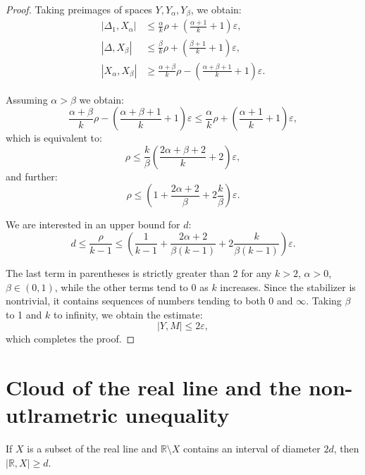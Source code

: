 \documentclass[leqno]{article}
\begin{document}
\begin{proof}
    Taking preimages of spaces $Y, Y_{\alpha}, Y_{\beta}$, we obtain:
    \begin{align*}
        |\Delta_1, X_{\alpha}| &\leq \frac{\alpha}{k}\rho +
        \left(\frac{\alpha+1}{k} + 1\right)\varepsilon, \\
        |\Delta, X_{\beta}| &\leq \frac{\beta}{k}\rho +
        \left(\frac{\beta+1}{k}+1\right)\varepsilon, \\
        |X_\alpha, X_{\beta}| &\geq \frac{\alpha+\beta}{k}\rho -
        \left(\frac{\alpha+\beta+1}{k}+1\right)\varepsilon.
    \end{align*}

    Assuming $\alpha > \beta$ we obtain:
    $$
    \frac{\alpha+\beta}{k}\rho -
    \left(\frac{\alpha+\beta+1}{k}+1\right)\varepsilon \leq
    \frac{\alpha}{k}\rho + \left(\frac{\alpha+1}{k} + 1\right)\varepsilon,
    $$
    which is equivalent to:
    $$
    \rho \leq
    \frac{k}{\beta}\left(\frac{2\alpha+\beta+2}{k}+2\right)\varepsilon,
    $$
    and further:
    $$
    \rho \leq \left(1+\frac{2\alpha + 2}{\beta} +
    2\frac{k}{\beta}\right)\varepsilon.
    $$

    We are interested in an upper bound for $d$:
    $$
    d \leq \frac{\rho}{k-1} \leq \left(\frac{1}{k-1}+\frac{2\alpha +
    2}{\beta(k-1)} + 2\frac{k}{\beta(k-1)}\right)\varepsilon.
    $$

    The last term in parentheses is strictly greater than 2 for any
    $k>2$, $\alpha>0$, $\beta\in (0,1)$, while the other terms tend to
    0 as $k$ increases. Since the stabilizer is nontrivial, it contains
    sequences of numbers tending to both 0 and $\infty$. Taking $\beta$
    to 1 and $k$ to infinity, we obtain the estimate:
    $$
    |Y, M| \leq 2\varepsilon,
    $$
    which completes the proof.
\end{proof}

\section{Cloud of the real line and the non-utlrametric unequality}

\begin{lemma}\label{lemmaDiamDist}
    If $X$ is a subset of the real line and $\mathbb{R}\setminus X$
    contains an interval of diameter $2d$, then $|\mathbb{R}, X| \ge d$.
\end{lemma}
\end{document}
